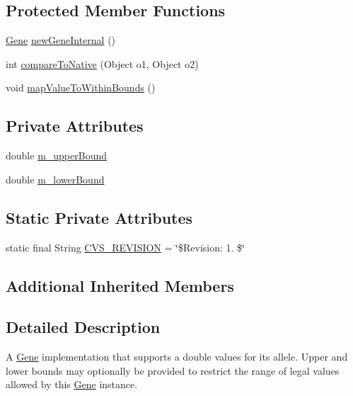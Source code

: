 \subsection*{Protected Member Functions}
\begin{DoxyCompactItemize}
\item 
\hyperlink{interfaceorg_1_1jgap_1_1_gene}{Gene} \hyperlink{classorg_1_1jgap_1_1impl_1_1_double_gene_af714cdfc2b8f7f3e4d397cf149c09b95}{new\-Gene\-Internal} ()
\item 
int \hyperlink{classorg_1_1jgap_1_1impl_1_1_double_gene_ac51a53a77b67a6ab2a220ac750be84a8}{compare\-To\-Native} (Object o1, Object o2)
\item 
void \hyperlink{classorg_1_1jgap_1_1impl_1_1_double_gene_a7487946984538fd71a24e0f8280a8e24}{map\-Value\-To\-Within\-Bounds} ()
\end{DoxyCompactItemize}
\subsection*{Private Attributes}
\begin{DoxyCompactItemize}
\item 
double \hyperlink{classorg_1_1jgap_1_1impl_1_1_double_gene_a258aa95e2039227c87fb0c78758bba8b}{m\-\_\-upper\-Bound}
\item 
double \hyperlink{classorg_1_1jgap_1_1impl_1_1_double_gene_a07193d7a0dc9a450d41463104ee72f02}{m\-\_\-lower\-Bound}
\end{DoxyCompactItemize}
\subsection*{Static Private Attributes}
\begin{DoxyCompactItemize}
\item 
static final String \hyperlink{classorg_1_1jgap_1_1impl_1_1_double_gene_aae41c294c77e89a7971fd485b9454507}{C\-V\-S\-\_\-\-R\-E\-V\-I\-S\-I\-O\-N} = \char`\"{}\$Revision\-: 1. \$\char`\"{}
\end{DoxyCompactItemize}
\subsection*{Additional Inherited Members}


\subsection{Detailed Description}
A \hyperlink{interfaceorg_1_1jgap_1_1_gene}{Gene} implementation that supports a double values for its allele. Upper and lower bounds may optionally be provided to restrict the range of legal values allowed by this \hyperlink{interfaceorg_1_1jgap_1_1_gene}{Gene} instance.

